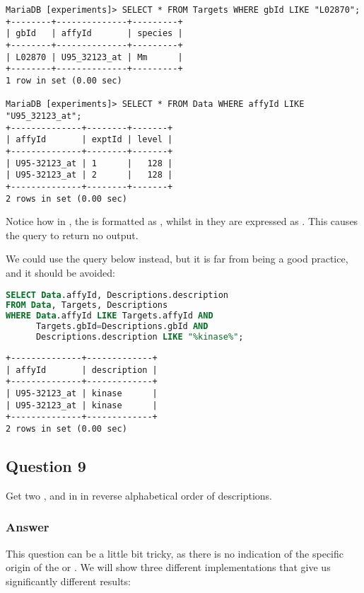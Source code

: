\begin{lstlisting}[style=output]
MariaDB [experiments]> SELECT * FROM Targets WHERE gbId LIKE "L02870";
+--------+--------------+---------+
| gbId   | affyId       | species |
+--------+--------------+---------+
| L02870 | U95_32123_at | Mm      |
+--------+--------------+---------+
1 row in set (0.00 sec)

MariaDB [experiments]> SELECT * FROM Data WHERE affyId LIKE "U95_32123_at";
+--------------+--------+-------+
| affyId       | exptId | level |
+--------------+--------+-------+
| U95-32123_at | 1      |   128 |
| U95-32123_at | 2      |   128 |
+--------------+--------+-------+
2 rows in set (0.00 sec)

\end{lstlisting}
Notice how in , the  is formatted as , whilst in  they are expressed as . This causes the query  to return no output.

\bigskip
We could use the query below instead, but it is far from being a good practice, and it should be avoided:
\begin{lstlisting}[language=sql]
SELECT Data.affyId, Descriptions.description
FROM Data, Targets, Descriptions
WHERE Data.affyId LIKE Targets.affyId AND
      Targets.gbId=Descriptions.gbId AND
      Descriptions.description LIKE "%kinase%";
\end{lstlisting}

\begin{lstlisting}[style=output]
+--------------+-------------+
| affyId       | description |
+--------------+-------------+
| U95-32123_at | kinase      |
| U95-32123_at | kinase      |
+--------------+-------------+
2 rows in set (0.00 sec)
\end{lstlisting}

\subsection*{Question 9}
Get two ,  and  in  in reverse alphabetical order of descriptions.

\subsubsection*{Answer}
This question can be a little bit tricky, as there is no indication of the specific origin of the  or . We will show three different implementations that give us significantly different results:

